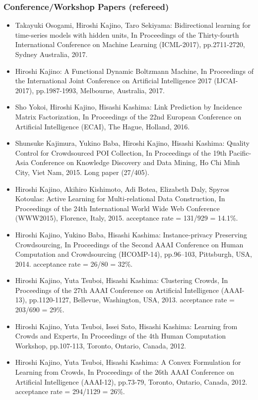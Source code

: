 \documentclass[a4paper,9pt]{article}
\begin{document}
\subsubsection*{Conference/Workshop Papers (refereed)}
\begin{itemize}
 \item Takayuki Osogami, Hiroshi Kajino, Taro Sekiyama: Bidirectional learning for time-series models with hidden units, In Proceedings of the Thirty-fourth International Conference on Machine Learning (ICML-2017), pp.2711-2720, Sydney Australia, 2017.
 \item Hiroshi Kajino: A Functional Dynamic Boltzmann Machine, In Proceedings of the International Joint Conference on Artificial Intelligence 2017 (IJCAI-2017), pp.1987-1993, Melbourne, Australia, 2017.
 \item Sho Yokoi, Hiroshi Kajino, Hisashi Kashima: Link Prediction by Incidence Matrix Factorization, In Proceedings of the 22nd European Conference on Artificial Intelligence (ECAI), The Hague, Holland, 2016.
 \item Shunsuke Kajimura, Yukino Baba, Hiroshi Kajino, Hisashi Kashima: Quality Control for Crowdsourced POI Collection, In Proceedings of the 19th Pacific-Asia Conference on Knowledge Discovery and Data Mining, Ho Chi Minh City, Viet Nam, 2015. Long paper (27/405).
 \item Hiroshi Kajino, Akihiro Kishimoto, Adi Botea, Elizabeth Daly, Spyros Kotoulas: Active Learning for Multi-relational Data Construction, In Proceedings of the 24th International World Wide Web Conference (WWW2015), Florence, Italy, 2015. acceptance rate = 131/929 = 14.1\%.
 \item Hiroshi Kajino, Yukino Baba, Hisashi Kashima: Instance-privacy Preserving Crowdsourcing, In Proceedings of the Second AAAI Conference on Human Computation and Crowdsourcing (HCOMP-14), pp.96--103, Pittsburgh, USA, 2014. acceptance rate = 26/80 = 32\%.
 \item Hiroshi Kajino, Yuta Tsuboi, Hisashi Kashima: Clustering Crowds, In Proceedings of the 27th AAAI Conference on Artificial Intelligence (AAAI-13), pp.1120-1127, Bellevue, Washington, USA, 2013. acceptance rate = 203/690 = 29\%.
 \item Hiroshi Kajino, Yuta Tsuboi, Issei Sato, Hisashi Kashima: Learning from Crowds and Experts, In Proceedings of the 4th Human Computation Workshop, pp.107-113, Toronto, Ontario, Canada, 2012.
 \item Hiroshi Kajino, Yuta Tsuboi, Hisashi Kashima: A Convex Formulation for Learning from Crowds, In Proceedings of the 26th AAAI Conference on Artificial Intelligence (AAAI-12), pp.73-79, Toronto, Ontario, Canada, 2012. acceptance rate = 294/1129 = 26\%.
\end{itemize}
\end{document}
